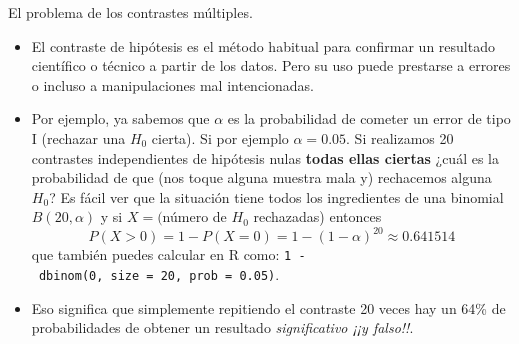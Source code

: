 \documentclass[
  9pt,
  ignorenonframetext,
]{beamer}
\begin{document}
\begin{frame}[fragile]{El problema de los contrastes múltiples.}
\protect\hypertarget{el-problema-de-los-contrastes-multiples.}{}

\begin{itemize}
\item
  El contraste de hipótesis es el método habitual para confirmar un
  resultado científico o técnico a partir de los datos. Pero su uso
  puede prestarse a errores o incluso a manipulaciones mal
  intencionadas.
\item
  Por ejemplo, ya sabemos que \(\alpha\) es la probabilidad de cometer
  un error de tipo I (rechazar una \(H_0\) cierta). Si por ejemplo
  \(\alpha = 0.05\). Si realizamos 20 contrastes independientes de
  hipótesis nulas \textbf{todas ellas ciertas} ¿cuál es la probabilidad
  de que (nos toque alguna muestra mala y) rechacemos alguna \(H_0\)? Es
  fácil ver que la situación tiene todos los ingredientes de una
  binomial \(B(20, \alpha)\) y si \(X = (\)número de \(H_0\) rechazadas)
  entonces
  \[P(X > 0) = 1 - P(X = 0) = 1 - (1 - \alpha)^{20}\approx0.641514\] que
  también puedes calcular en R como:
  \texttt{1\ -\ dbinom(0,\ size\ =\ 20,\ prob\ =\ 0.05)}.
\item
  Eso significa que simplemente repitiendo el contraste 20 veces hay un
  64\% de probabilidades de obtener un resultado \emph{significativo ¡¡y
  falso!!}.
\end{itemize}

\end{frame}
\end{document}
